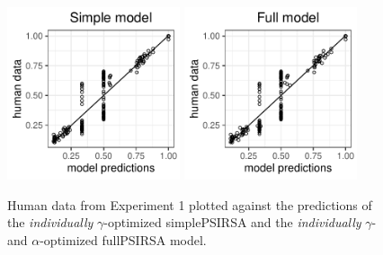 \documentclass[10pt,a4paper]{article}
\newcommand{\gcs}[1]{\textcolor{blue}{[gcs: #1]}}
\begin{document}


\begin{figure}[ht]
	\centering
	\includegraphics[width=2in]{images/m3.pdf}
	\includegraphics[width=2in]{images/m16.pdf}
	\caption{Human data from Experiment 1 plotted against the predictions of the \emph{individually} $\gamma$-optimized simplePSIRSA and the \emph{individually} $\gamma$- and $\alpha$-optimized fullPSIRSA model.}\label{simple-full-individual}
\end{figure}
\end{document}
